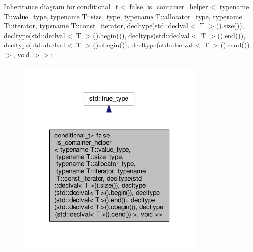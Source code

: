 Inheritance diagram for conditional\-\_\-t$<$ false, is\-\_\-container\-\_\-helper$<$ typename T\-:\-:value\-\_\-type, typename T\-:\-:size\-\_\-type, typename T\-:\-:allocator\-\_\-type, typename T\-:\-:iterator, typename T\-:\-:const\-\_\-iterator, decltype(std\-:\-:declval$<$ T $>$().size()), decltype(std\-:\-:declval$<$ T $>$().begin()), decltype(std\-:\-:declval$<$ T $>$().end()), decltype(std\-:\-:declval$<$ T $>$().cbegin()), decltype(std\-:\-:declval$<$ T $>$().cend()) $>$, void $>$$>$\-:
\nopagebreak
\begin{figure}[H]
\begin{center}
\leavevmode
\includegraphics[width=262pt]{structis__container_3_01_t_00_01std_1_1conditional__t_3_01false_00_01is__container__helper_3_01t68dd0d5b6c9daa5bcca843ba638d58fd}
\end{center}
\end{figure}


